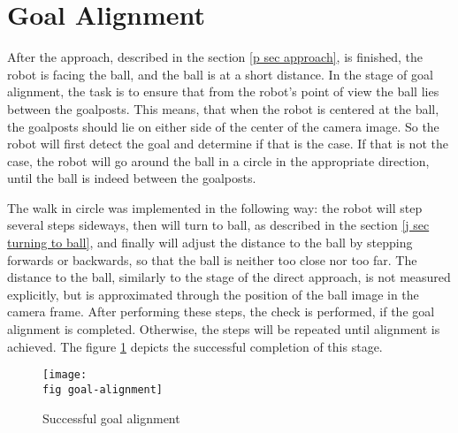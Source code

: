 \section{Goal Alignment}
\label{p sec goal align}

After the approach, described in the section \ref{p sec approach}, is finished,
the robot is facing the ball, and the ball is at a short distance. In the stage
of goal alignment, the task is to ensure that from the robot's point of view
the ball lies between the goalposts. This means, that when the robot is
centered at the ball, the goalposts should lie on either side of the center of
the camera image. So the robot will first detect the goal and determine if that
is the case. If that is not the case, the robot will go around the ball in a
circle in the appropriate direction, until the ball is indeed between the
goalposts.

The walk in circle was implemented in the following way: the robot will step
several steps sideways, then will turn to ball, as described in the section
\ref{j sec turning to ball}, and finally will adjust the distance to the ball
by stepping forwards or backwards, so that the ball is neither too close nor
too far. The distance to the ball, similarly to the stage of the direct
approach, is not measured explicitly, but is approximated through the position
of the ball image in the camera frame. After performing these steps, the check
is performed, if the goal alignment is completed. Otherwise, the steps will be
repeated until alignment is achieved. The figure \ref{p figure goal-alignment}
depicts the successful completion of this stage.

\begin{figure}[ht]
  \texttt{[image: \\fig goal-alignment]}
  \caption{Successful goal alignment}
  \label{p figure goal-alignment}
\end{figure}
